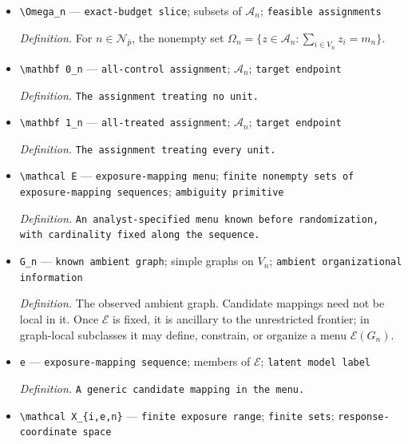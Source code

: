 \documentclass{article}
\begin{document}
\begin{itemize}
  \item \texttt{\textbackslash{}\allowbreak{}Omega\_\allowbreak{}n} --- \texttt{exact-\allowbreak{}budget slice}; subsets of \(\mathcal A_n\); \texttt{feasible assignments}
  \par\smallskip\noindent\emph{Definition.} For \(n\in\mathcal N_{\bar p}\), the nonempty set \(\Omega_n=\{z\in\mathcal A_n:\sum_{i\in V_n}z_i=m_n\}\).
  \item \texttt{\textbackslash{}\allowbreak{}mathbf 0\_\allowbreak{}n} --- \texttt{all-\allowbreak{}control assignment}; \(\mathcal A_n\); \texttt{target endpoint}
  \par\smallskip\noindent\emph{Definition.} \texttt{The assignment treating no unit.}
  \item \texttt{\textbackslash{}\allowbreak{}mathbf 1\_\allowbreak{}n} --- \texttt{all-\allowbreak{}treated assignment}; \(\mathcal A_n\); \texttt{target endpoint}
  \par\smallskip\noindent\emph{Definition.} \texttt{The assignment treating every unit.}
  \item \texttt{\textbackslash{}\allowbreak{}mathcal E} --- \texttt{exposure-\allowbreak{}mapping menu}; \texttt{finite nonempty sets of exposure-\allowbreak{}mapping sequences}; \texttt{ambiguity primitive}
  \par\smallskip\noindent\emph{Definition.} \texttt{An analyst-\allowbreak{}specified menu known before randomization,\allowbreak{} with cardinality fixed along the sequence.}
  \item \texttt{G\_\allowbreak{}n} --- \texttt{known ambient graph}; simple graphs on \(V_n\); \texttt{ambient organizational information}
  \par\smallskip\noindent\emph{Definition.} The observed ambient graph. Candidate mappings need not be local in it. Once \(\mathcal E\) is fixed, it is ancillary to the unrestricted frontier; in graph-local subclasses it may define, constrain, or organize a menu \(\mathcal E(G_n)\).
  \item \texttt{e} --- \texttt{exposure-\allowbreak{}mapping sequence}; members of \(\mathcal E\); \texttt{latent model label}
  \par\smallskip\noindent\emph{Definition.} \texttt{A generic candidate mapping in the menu.}
  \item \texttt{\textbackslash{}\allowbreak{}mathcal X\_\allowbreak{}\{i,\allowbreak{}e,\allowbreak{}n\}\allowbreak{}} --- \texttt{finite exposure range}; \texttt{finite sets}; \texttt{response-\allowbreak{}coordinate space}

\end{itemize}
\end{document}
